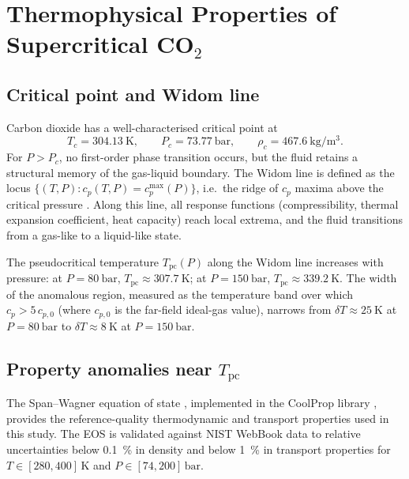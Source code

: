 \documentclass[12pt,a4paper]{article}
\newcommand{\Tc}{T_{\mathrm{pc}}}   %
\begin{document}
\section{Thermophysical Properties of Supercritical CO$_2$}
\label{sec:props}

\subsection{Critical point and Widom line}
\label{sec:props:widom}

Carbon dioxide has a well-characterised critical point at
\begin{equation}
  T_c = \SI{304.13}{\kelvin}, \qquad
  P_c = \SI{73.77}{\bar}, \qquad
  \rho_c = \SI{467.6}{\kilo\gram\per\metre\cubed}.
\end{equation}
For $P > P_c$, no first-order phase transition occurs, but the fluid retains a
structural memory of the gas-liquid boundary.  The Widom line is defined as the
locus $\{(T,P) : c_p(T,P) = c_p^{\max}(P)\}$, i.e.\ the ridge of $c_p$ maxima
above the critical pressure \citep{Xu2005,Banuti2017}.  Along this line, all
response functions (compressibility, thermal expansion coefficient, heat capacity)
reach local extrema, and the fluid transitions from a gas-like to a liquid-like
state.

The pseudocritical temperature $\Tc(P)$ along the Widom line increases with
pressure: at $P = \SI{80}{\bar}$, $\Tc \approx \SI{307.7}{\kelvin}$; at
$P = \SI{150}{\bar}$, $\Tc \approx \SI{339.2}{\kelvin}$.  The width of the
anomalous region, measured as the temperature band over which $c_p > 5\,c_{p,0}$
(where $c_{p,0}$ is the far-field ideal-gas value), narrows from
$\delta T \approx \SI{25}{\kelvin}$ at $P = \SI{80}{\bar}$ to
$\delta T \approx \SI{8}{\kelvin}$ at $P = \SI{150}{\bar}$.

\subsection{Property anomalies near $\Tc$}
\label{sec:props:anomalies}

The Span--Wagner equation of state \citep{Span1996}, implemented in the
CoolProp library \citep{Bell2014}, provides the reference-quality thermodynamic
and transport properties used in this study.  The EOS is validated against NIST
WebBook data to relative uncertainties below \SI{0.1}{\percent} in density and
below \SI{1}{\percent} in transport properties for $T \in [280, 400]\,\si{\kelvin}$
and $P \in [74, 200]\,\si{\bar}$.
\end{document}
